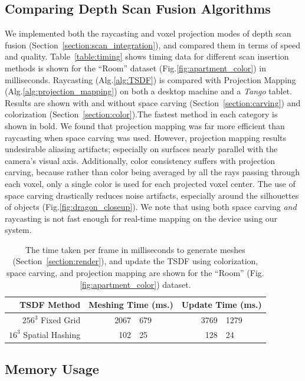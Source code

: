 \documentclass[conference]{IEEEtran}
\newcommand{\sref}[1]{Section~\ref{#1}}
\newcommand{\figref}[1]{Fig.\ref{#1}}
\newcommand{\tabref}[1]{Table~\ref{#1}}
\newcommand{\algoref}[1]{Alg.\ref{#1}}
\newcommand{\Tango}{\textit{Tango}\xspace}
\newcommand{\TSDF}{TSDF\xspace}
\begin{document}
\subsection{Comparing Depth Scan Fusion Algorithms} 
\label{section:scan_compare}
We implemented both the raycasting and voxel projection modes of depth scan
fusion (\sref{section:scan_integration}), and compared them in terms of speed
and quality. \tabref{table:timing} shows timing data for different scan
insertion methods is shown for the ``Room'' dataset
(\figref{fig:apartment_color}) in milliseconds. Raycasting (\algoref{alg:TSDF})
is compared with Projection Mapping (\algoref{alg:projection_mapping}) on both a
desktop machine and a \Tango tablet. Results are shown with and without
space carving (\sref{section:carving}) and colorization
(\sref{section:color}).The fastest method in each category is shown in bold. We
found that projection mapping was far more efficient than raycasting when space
carving was used. However, projection mapping results undesirable aliasing
artifacts; especially on surfaces nearly parallel with the camera's visual axis.
Additionally, color consistency suffers with projection carving, because rather
than color being averaged by all the rays passing through each voxel, only a
single color is used for each projected voxel center. The use of space carving
drastically reduces noise artifacts, especially around the silhouettes of
objects (\figref{fig:dragon_closeup}). We note that using both space carving
\emph{and} raycasting is not fast enough for real-time mapping on the device
using our system.

\begin{table}
\centering
\begin{tabular} {rr@{ $\pm$ }lr@{ $\pm$ }l} \toprule
\TSDF Method & \multicolumn{2}{c}{Meshing Time (ms.)} & \multicolumn{2}{c}{Update Time (ms.)}\\ 
\midrule
$256^3$ Fixed Grid     & 2067 & 679 & 3769 & 1279  \\
$16^3$ Spatial Hashing & 102  &  25 & 128 &   24   \\ 
\bottomrule
\end{tabular}
\caption{The time taken per frame in milliseconds to generate meshes
(\sref{section:render}), and update the \TSDF using colorization, space carving, and projection mapping
are shown for the ``Room'' (\figref{fig:apartment_color}) dataset.}
\label{table:meshingtimes}
\end{table}

\subsection{Memory Usage}
\label{section:memory}
\end{document}
